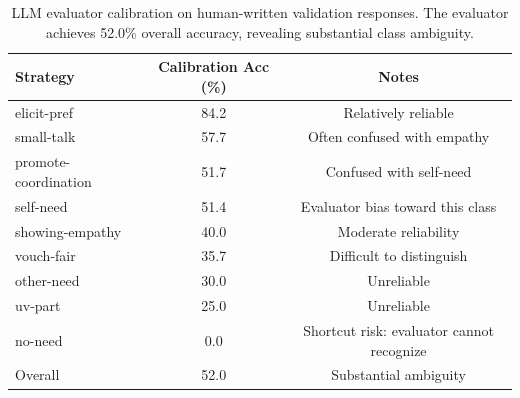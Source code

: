 \begin{table}[t]
\centering
\caption{LLM evaluator calibration on human-written validation responses.
         The evaluator achieves 52.0\% overall accuracy, revealing substantial
         class ambiguity.}
\label{tab:calib}
\begin{tabular}{lcc}
\toprule
\textbf{Strategy} & \textbf{Calibration Acc (\%)} & \textbf{Notes} \\
\midrule
elicit-pref         & 84.2 & Relatively reliable \\
small-talk          & 57.7 & Often confused with empathy \\
promote-coordination& 51.7 & Confused with self-need \\
self-need           & 51.4 & Evaluator bias toward this class \\
showing-empathy     & 40.0 & Moderate reliability \\
vouch-fair          & 35.7 & Difficult to distinguish \\
other-need          & 30.0 & Unreliable \\
uv-part             & 25.0 & Unreliable \\
no-need             & 0.0  & Shortcut risk: evaluator cannot recognize \\
\midrule
Overall             & 52.0 & Substantial ambiguity \\
\bottomrule
\end{tabular}
\end{table}
